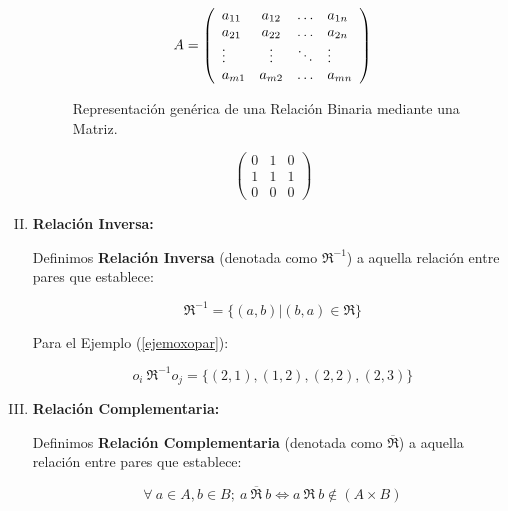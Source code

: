 \begin{enumerate}[I.]
{{\begin{enumerate}[i.]
\begin{figure}[h]
\begin{center}
\[
A=\left(
\begin{array}{l c c l}
a_{11} & a_{12} & \ldots & a_{1n}\\
a_{21} & a_{22} & \ldots & a_{2n}\\
\vdots & \vdots & \ddots & \vdots\\
a_{m1} & a_{m2} & \ldots & a_{mn}\\
\end{array}
\right)
\]

\caption{Representación genérica de una Relación Binaria mediante una Matriz.}

\end{center}
 
\end{figure}


\[
\begin{pmatrix}
0 & 1 & 0 \\
1 & 1 & 1 \\
0 & 0 & 0
\end{pmatrix}
\]



\end{enumerate}

}

}

\item \textbf{Relación Inversa:}{

 Definimos \textbf{Relación Inversa} (denotada como $\Re^{-1}$) a aquella 
relación entre pares que establece:

\begin{equation}
\Re^{-1} = \{(a,b)|(b,a) \in \Re\}
\end{equation}

\ejem Para el Ejemplo (\ref{ejemoxopar}):

\begin{equation}
o_i\ \Re^{-1} o_j = \{(2,1),(1,2),(2,2),(2,3)\}
\end{equation}

}
\item \textbf{Relación Complementaria:}{

 Definimos \textbf{Relación Complementaria} (denotada como 
$\overline{\Re}$) a aquella relación entre pares que establece:


\begin{equation}
\forall\ a \in A, b \in B;\ a\ \overline{\Re}\ b \Leftrightarrow a\ \Re\ b 
\notin (A\times B)
\end{equation}

}
\end{enumerate}

